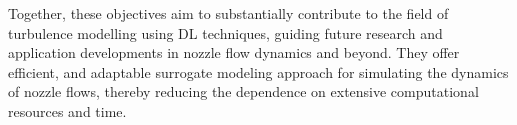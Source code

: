 Together, these objectives aim to substantially contribute to the field of turbulence modelling using DL techniques, guiding future research and application developments in nozzle flow dynamics and beyond. They offer efficient, and adaptable surrogate modeling approach for simulating the dynamics of nozzle flows, thereby reducing the dependence on extensive computational resources and time.